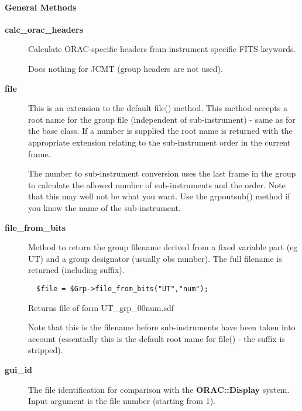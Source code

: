 \paragraph*{General Methods\label{ORAC::Group::JCMT_General_Methods}}\begin{description}
\item[\textbf{calc\_orac\_headers}] \mbox{}

Calculate ORAC-specific headers from instrument specific FITS 
keywords.



Does nothing for JCMT (group headers are not used).

\item[\textbf{file}] \mbox{}

This is an extension to the default file() method.
This method accepts a root name for the group file
(independent of sub-instrument) - same as for the base 
class. If a number is supplied the root name is returned
with the appropriate extension relating to the 
sub-instrument order in the current frame.



The number to sub-instrument conversion uses the last frame in the
group to calculate the allowed number of sub-instruments and
the order. Note that this may well not be what you want.
Use the grpoutsub() method if you know the name of the sub-instrument.

\item[\textbf{file\_from\_bits}] \mbox{}

Method to return the group filename derived from a fixed
variable part (eg UT) and a group designator (usually obs
number). The full filename is returned (including suffix).

\begin{verbatim}
  $file = $Grp->file_from_bits("UT","num");
\end{verbatim}


Returns file of form UT\_grp\_00num.sdf



Note that this is the filename before sub-instruments
have been taken into account (essentially this is the
default root name for file() - the suffix is stripped).

\item[\textbf{gui\_id}] \mbox{}

The file identification for comparison with the \textbf{ORAC::Display}
system. Input argument is the file number (starting from 1).




\end{description}
